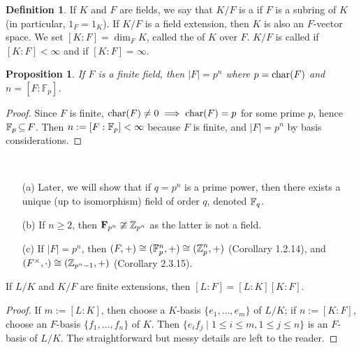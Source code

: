 \documentclass[11pt]{book}
\newcounter{counter}
\newtheorem{proposition}[counter]{Proposition}   \newtheorem{problem}[counter]{Problem}   \newtheorem*{proposition*}{Proposition}   \newtheorem*{lemma*}{Lemma}
\theoremstyle{definition}   \newtheorem{defn}[counter]{Definition} %
\newcommand{\vs}{\vspace{8pt}}
\numberwithin{counter}{chapter}
\begin{document}
\vs

\begin{defn}
If $K$ and $F$ are fields, we say that $K/F$ is a  if $F$ is a subring of $K$ (in particular, $1_F = 1_K$). If $K/F$ is a field extension, then $K$ is also an $F$-vector space. We set $[K : F] = \dim_F K$, called the  of $K$ over $F$. $K/F$ is called  if $[K : F] < \infty$ and  if $[K : F] = \infty$. 
\end{defn}

\vs

\begin{proposition}
If $F$ is a finite field, then $|F| = p^n$ where $p = \textnormal{char}(F)$ and $n = [F : \mathbb{F}_p]$. 
\end{proposition}

\begin{proof}
Since $F$ is finite, $\textnormal{char}(F) \ne 0 \implies \textnormal{char}(F) = p$ for some prime $p$, hence $\mathbb{F}_p \operatorname{\subseteq} F$. Then $n := [F : \mathbb{F}_p] < \infty$ because $F$ is finite, and $|F| = p^n$ by basis considerations. 
\end{proof}

\vs

\begin{remark}\ 
\begin{enumerate}
\item[(a)] Later, we will show that if $q = p^n$ is a prime power, then there exists a unique (up to isomorphism) field of order $q$, denoted $\mathbb{F}_q$. 
\item[(b)] If $n \geq 2$, then $\mathbf{F}_{p^n} \ncong \operatorname{\mathbb{Z}}_{p^n}$ as the latter is not a field.
\item[(c)] If $|F| = p^n$, then $(F,+) \cong (\mathbb{F}_p^n,+) \cong (\operatorname{\mathbb{Z}}_{p}^n,+)$ (Corollary 1.2.14), and $(F^{\times},\cdot) \cong (\operatorname{\mathbb{Z}}_{p^n-1},+)$ (Corollary 2.3.15). 
\end{enumerate}
\end{remark}

\vs

\begin{lemma}
If $L/K$ and $K/F$ are finite extensions, then $[L : F] = [L : K] [K : F]$.
\end{lemma}

\begin{proof}
If $m := [L : K]$, then choose a $K$-basis $\{e_1,\dots,e_m\}$ of $L/K$; if $n := [K : F]$, choose an $F$-basis $\{f_1,\dots,f_n\}$ of $K$. Then $\{e_i f_j \mid 1 \leq i \leq m, 1 \leq j \leq n\}$ is an $F$-basis of $L/K$. The straightforward but messy details are left to the reader.
\end{proof}
\end{document}
